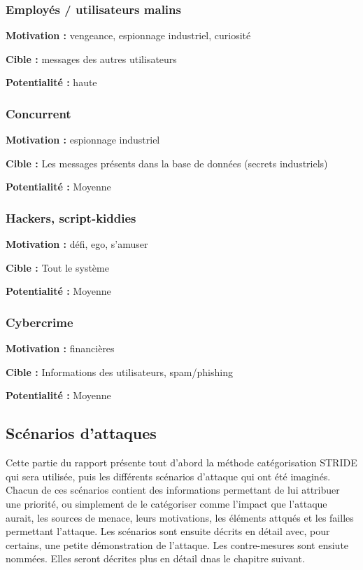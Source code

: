 \documentclass{article}
\begin{document}
\hypertarget{employuxe9s-utilisateurs-malins}{%
\subsubsection{Employés / utilisateurs
malins}\label{employuxe9s-utilisateurs-malins}}

\textbf{Motivation :} vengeance, espionnage industriel, curiosité

\textbf{Cible :} messages des autres utilisateurs

\textbf{Potentialité :} haute

\hypertarget{concurrent}{%
\subsubsection{Concurrent}\label{concurrent}}

\textbf{Motivation :} espionnage industriel

\textbf{Cible :} Les messages présents dans la base de données (secrets
industriels)

\textbf{Potentialité :} Moyenne

\hypertarget{hackers-script-kiddies}{%
\subsubsection{Hackers, script-kiddies}\label{hackers-script-kiddies}}

\textbf{Motivation :} défi, ego, s'amuser

\textbf{Cible :} Tout le système

\textbf{Potentialité :} Moyenne

\hypertarget{cybercrime}{%
\subsubsection{Cybercrime}\label{cybercrime}}

\textbf{Motivation :} financières

\textbf{Cible :} Informations des utilisateurs, spam/phishing

\textbf{Potentialité :} Moyenne

\hypertarget{scuxe9narios-dattaques}{%
\subsection{Scénarios d'attaques}\label{scuxe9narios-dattaques}}

Cette partie du rapport présente tout d'abord la méthode catégorisation
STRIDE qui sera utilisée, puis les différents scénarios d'attaque qui
ont été imaginés. Chacun de ces scénarios contient des informations
permettant de lui attribuer une priorité, ou simplement de le
catégoriser comme l'impact que l'attaque aurait, les sources de menace,
leurs motivations, les éléments attqués et les failles permettant
l'attaque. Les scénarios sont ensuite décrits en détail avec, pour
certains, une petite démonstration de l'attaque. Les contre-mesures sont
ensiute nommées. Elles seront décrites plus en détail dnas le chapitre
suivant.
\end{document}
